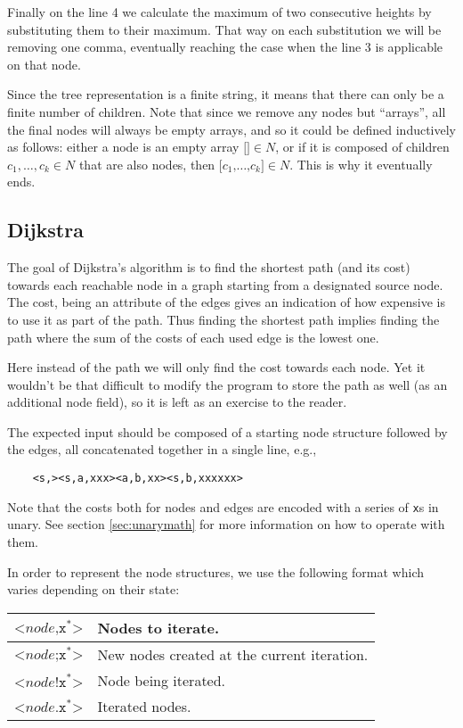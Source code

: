 Finally on the line 4 we calculate the maximum of two consecutive heights
by substituting them to their maximum.  That way on each substitution we
will be removing one comma, eventually reaching the case when the line 3
is applicable on that node.

Since the tree representation is a finite string, it means that there can
only be a finite number of children.  Note that since we remove any nodes
but ``arrays'', all the final nodes will always be empty arrays, and so
it could be defined inductively as follows:
either a node is an empty array $\texttt{[]}\in N$, or if it is
composed of children $c_1, \ldots, c_k\in N$ that are also nodes, then
$\texttt{[}c_1\texttt{,}\ldots\texttt{,}c_k\texttt{]} \in N$.  This is why
it eventually ends.

\subsection{Dijkstra}

The goal of Dijkstra's algorithm is to find the shortest path (and its
cost) towards each reachable node in a graph starting from a designated
source node.  The cost, being an attribute of the edges gives an
indication of how expensive is to use it as part of the path.  Thus
finding the shortest path implies finding the path where the sum of
the costs of each used edge is the lowest one.

Here instead of the path we will only find the cost towards each node.
Yet it wouldn't be that difficult to modify the program
to store the path as well (as an additional node field), so it is left
as an exercise to the reader.

The expected input should be composed of a starting node structure
followed by the edges, all concatenated together in a single line, e.g.,

\begin{Verbatim}
	<s,><s,a,xxx><a,b,xx><s,b,xxxxxx>
\end{Verbatim}

Note that the costs both for nodes and edges are encoded with a series
of {\tt x}s in unary.  See section \ref{sec:unarymath} for more
information on how to operate with them.


In order to represent the node structures, we use the following format
which varies depending on their state:
\begin{center}
	\begin{tabular}{|l|l|}
		\hline
		$\texttt{<}node\texttt{,x}^*\texttt{>}$ & Nodes to iterate.\\
		\hline
		$\texttt{<}node\texttt{;x}^*\texttt{>}$
			& New nodes created at the current iteration.\\
		\hline
		$\texttt{<}node\texttt{!x}^*\texttt{>}$ & Node being iterated.\\
		\hline
		$\texttt{<}node\texttt{.x}^*\texttt{>}$ & Iterated nodes.\\
		\hline
	\end{tabular}
\end{center}

